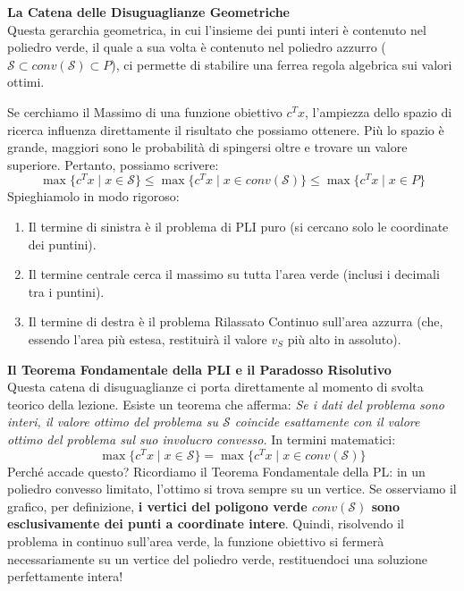 \documentclass[12pt, a4paper]{article}
\begin{document}
	\vspace{0.4cm}
	\textbf{La Catena delle Disuguaglianze Geometriche}\\
	Questa gerarchia geometrica, in cui l'insieme dei punti interi è contenuto nel poliedro verde, il quale a sua volta è contenuto nel poliedro azzurro ($\mathcal{S} \subset conv(\mathcal{S}) \subset P$), ci permette di stabilire una ferrea regola algebrica sui valori ottimi. 
	
	Se cerchiamo il Massimo di una funzione obiettivo $c^T x$, l'ampiezza dello spazio di ricerca influenza direttamente il risultato che possiamo ottenere. Più lo spazio è grande, maggiori sono le probabilità di spingersi oltre e trovare un valore superiore. Pertanto, possiamo scrivere:
	\[
	\max \{ c^T x \mid x \in \mathcal{S} \} \leq \max \{ c^T x \mid x \in conv(\mathcal{S}) \} \leq \max \{ c^T x \mid x \in P \}
	\]
	Spieghiamolo in modo rigoroso:
	\begin{enumerate}
		\item Il termine di sinistra è il problema di PLI puro (si cercano solo le coordinate dei puntini).
		\item Il termine centrale cerca il massimo su tutta l'area verde (inclusi i decimali tra i puntini).
		\item Il termine di destra è il problema Rilassato Continuo sull'area azzurra (che, essendo l'area più estesa, restituirà il valore $v_S$ più alto in assoluto).
	\end{enumerate}
	
	\vspace{0.4cm}
	\textbf{Il Teorema Fondamentale della PLI e il Paradosso Risolutivo}\\
	Questa catena di disuguaglianze ci porta direttamente al momento di svolta teorico della lezione. Esiste un teorema che afferma: \textit{Se i dati del problema sono interi, il valore ottimo del problema su $\mathcal{S}$ coincide esattamente con il valore ottimo del problema sul suo involucro convesso.}
	In termini matematici:
	\[
	\max \{ c^T x \mid x \in \mathcal{S} \} = \max \{ c^T x \mid x \in conv(\mathcal{S}) \}
	\]
	Perché accade questo? Ricordiamo il Teorema Fondamentale della PL: in un poliedro convesso limitato, l'ottimo si trova sempre su un vertice. Se osserviamo il grafico, per definizione, \textbf{i vertici del poligono verde $conv(\mathcal{S})$ sono esclusivamente dei punti a coordinate intere}. Quindi, risolvendo il problema in continuo sull'area verde, la funzione obiettivo si fermerà necessariamente su un vertice del poliedro verde, restituendoci una soluzione perfettamente intera!
	
\end{document}
